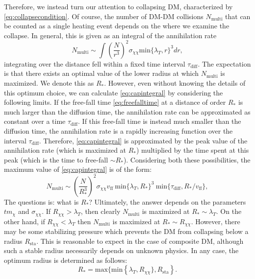 \documentclass[preprintnumbers,amsmath,amssymb,prd,superscriptaddress]{revtex4}
\def\r{\right)}
\def\l{\left(}
\begin{document}
Therefore, we instead turn our attention to collapsing DM, characterized by \eqref{eq:collapsecondition}. 
Of course, the number of DM-DM collisions $N_\text{multi}$ that can be counted as a single heating event depends on the where we examine the collapse. 
In general, this is given as an integral of the annihilation rate
\begin{equation}
\label{eq:capintegral}
N_\text{multi} \sim \int \l \frac{N}{r^3}\r^2 \sigma_{\chi \chi} \text{min}\{\lambda_T, r\}^3 dr,
\end{equation}
integrating over the distance fell within a fixed time interval $\tau_\text{diff}$. 
The expectation is that there exists an optimal value of the lower radius at which $N_\text{multi}$ is maximized.
We denote this as $R_*$. 
However, even without knowing the details of this optimum choice, we can calculate \eqref{eq:capintegral} by considering the following limits. 
If the free-fall time \eqref{eq:freefalltime} at a distance of order $R_*$ is much larger than the diffusion time, the annihilation rate can be approximated as constant over a time $\tau_\text{diff}$.
If this free-fall time is instead much smaller than the diffusion time, the annihilation rate is a rapidly increasing function over the interval $\tau_\text{diff}$.
Therefore, \eqref{eq:capintegral} is approximated by the peak value of the annihilation rate (which is maximized at $R_*$) multiplied by the time spent at this peak (which is the time to free-fall $\sim R_*$).
Considering both these possibilities, the maximum value of \eqref{eq:capintegral} is of the form: 
\begin{equation}
N_\text{multi} \sim \l \frac{N}{R_*^3}\r^2  \sigma_{\chi \chi} v_\text{ff} ~\text{min}\{\lambda_T, R_*\}^3 ~\text{min}\{\tau_\text{diff}, R_*/v_\text{ff}\},
\end{equation}
The questions is: what is $R_*$?
Ultimately, the answer depends on the parameters $tm_\chi$ and $\sigma_{\chi \chi}$. 
If $R_{\chi \chi} > \lambda_T$, then clearly $N_\text{multi}$ is maximized at $R_* \sim \lambda_T$.
On the other hand, if $R_{\chi \chi} < \lambda_T$ then $N_\text{multi}$ is maximized at $R_* \sim R_{\chi \chi}$.
However, there may be some stabilizing pressure which prevents the DM from collapsing below a radius $R_\text{sta}$.
This is reasonable to expect in the case of composite DM, although such a stable radius necessarily depends on unknown physics. 
In any case, the optimum radius is determined as follows:
\begin{equation}
R_* = \text{max}\{\text{min}\left \{\lambda_T, R_{\chi \chi}\}, R_\text{sta}\right\}.
\end{equation}
\end{document}
